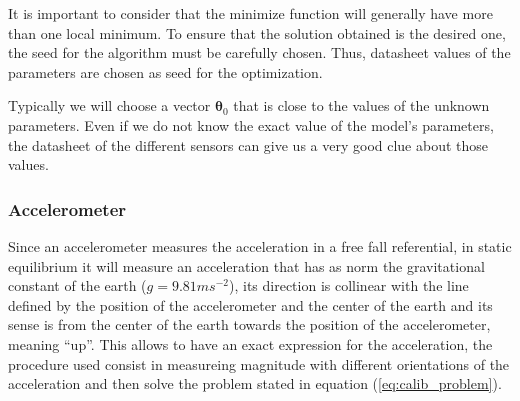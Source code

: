 \documentclass[conference]{IEEEtran}
\newcommand{\refp}[1]{(\ref{#1})}
\begin{document}
It is important to consider that the minimize function will generally have more than one local minimum. To ensure that the solution obtained is the desired one, the seed for the algorithm must be carefully chosen. Thus, datasheet values of the parameters are chosen as seed for the optimization.

Typically we will choose a vector $\boldsymbol{\theta}_0$ that is close to the values of the unknown parameters. Even if we do not know the exact value of the model's parameters, the datasheet of the different sensors can give us a very good clue about those values.\\

\subsubsection{Accelerometer}
\label{subsec:acc}
Since an accelerometer measures the acceleration in a free fall referential, in static equilibrium it will measure an acceleration that has as norm the gravitational constant of the  earth ($g = 9.81ms^{-2}$), its direction is collinear with the line defined by the position of the accelerometer and the center of the earth and its sense is from the center of the earth towards the position of the accelerometer, meaning ``up''. This allows to have an exact expression for the acceleration, the procedure used consist in measureing magnitude with different orientations of the acceleration and then solve the problem stated in equation \refp{eq:calib_problem}.\\
\end{document}
